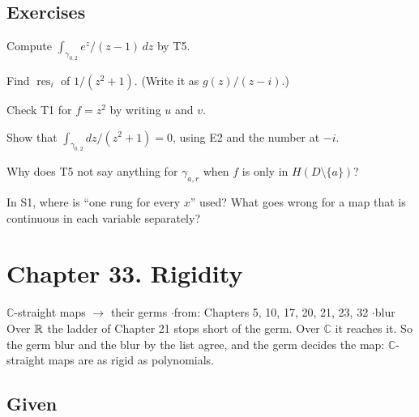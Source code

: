 \subsection*{Exercises}

\begin{lines}
\item[\lab{E1}] Compute $\int_{\gamma_{0,2}} e^z/(z - 1)\,dz$ by T5.
\item[\lab{E2}] Find $\operatorname{res}_i$ of $1/(z^2 + 1)$. (Write it as $g(z)/(z - i)$.)
\item[\lab{E3}] Check T1 for $f = z^2$ by writing $u$ and $v$.
\item[\lab{E4}] Show that $\int_{\gamma_{0,2}} dz/(z^2 + 1) = 0$, using E2 and the number at $-i$.
\item[\lab{E5}] Why does T5 not say anything for $\gamma_{a,r}$ when $f$ is only in $H(D \setminus \{a\})$?
\item[\lab{E6}] In S1, where is ``one rung for every $x$'' used? What goes wrong for a map that is continuous in each variable separately?
\end{lines}
\newpage

\section*{Chapter 33. Rigidity}
\begin{center}
{\normalsize $\mathbb{C}$-straight maps $\to$ their germs \quad$\cdot$\quad from: Chapters 5, 10, 17, 20, 21, 23, 32 \quad$\cdot$\quad blur}\\[4pt]
{\small Over $\mathbb{R}$ the ladder of Chapter 21 stops short of the germ. Over $\mathbb{C}$ it reaches it. So the germ blur and the blur by the list agree, and the germ decides the map: $\mathbb{C}$-straight maps are as rigid as polynomials.}
\end{center}

\subsection*{Given}


